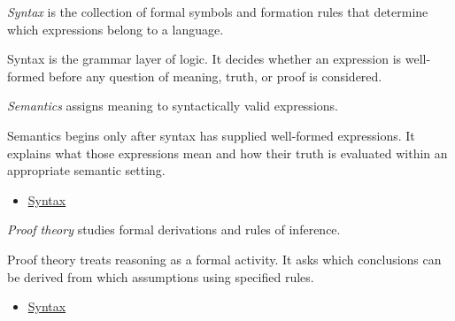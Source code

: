 \begin{definition}[Syntax]
\label{def:propositional-logic-syntax}
\emph{Syntax} is the collection of formal symbols and formation rules that
determine which expressions belong to a language.
\end{definition}

\begin{remark*}[Interpretation]
Syntax is the grammar layer of logic. It decides whether an expression is
well-formed before any question of meaning, truth, or proof is considered.
\end{remark*}

\NoLocalDependencies

\begin{definition}[Semantics]
\label{def:propositional-logic-semantics}
\emph{Semantics} assigns meaning to syntactically valid expressions.
\end{definition}

\begin{remark*}[Interpretation]
Semantics begins only after syntax has supplied well-formed expressions. It
explains what those expressions mean and how their truth is evaluated within
an appropriate semantic setting.
\end{remark*}

\begin{dependencies}
\begin{itemize}
  \item \hyperref[def:propositional-logic-syntax]{Syntax}
\end{itemize}
\end{dependencies}

\begin{definition}
\label{def:propositional-logic-proof-theory}
\emph{Proof theory} studies formal derivations and rules of inference.
\end{definition}

\begin{remark*}[Interpretation]
Proof theory treats reasoning as a formal activity. It asks which conclusions
can be derived from which assumptions using specified rules.
\end{remark*}

\begin{dependencies}
\begin{itemize}
  \item \hyperref[def:propositional-logic-syntax]{Syntax}
\end{itemize}
\end{dependencies}

